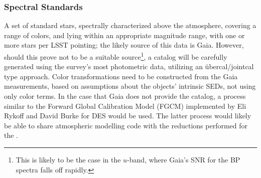 %
%

\subsubsection{Spectral Standards}\label{sec:CPP:output:spectralStandards} 
A set of standard stars, spectrally characterized above the atmosphere, covering a range of colors, and lying within an appropriate magnitude range, with one or more stars per LSST pointing; the likely source of this data is Gaia. However, should this prove not to be a suitable source\footnote{ This is likely to be the case in the $u$-band, where Gaia's SNR for the BP spectra falls off rapidly.}, a catalog will be carefully generated using the survey's most photometric data, utilizing an \"ubercal/jointcal type approach.
\alg Color transformations need to be constructed from the Gaia measurements, based on assumptions about the objects' intrinsic SEDs, \ie not using only color terms. In the case that Gaia does not provide the catalog, a process similar to the Forward Global Calibration Model (FGCM) implemented by Eli Rykoff and David Burke for DES would be used. The latter process would likely be able to share atmospheric modelling code with the reductions performed for the \auxtelescope.


